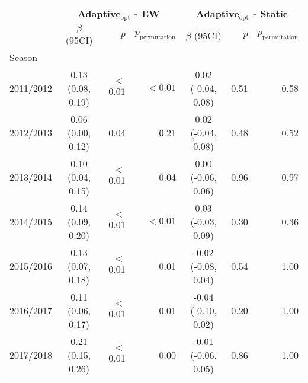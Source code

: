 \documentclass[12pt]{article}
\begin{document}
\begin{table}[ht!]
  \begin{tabular}{lcrrcrr}
    \hline
     & \multicolumn{3}{c}{\textbf{Adaptive$_{\text{opt}}$ - EW}} & \multicolumn{3}{c}{\textbf{Adaptive$_{\text{opt}}$ - Static}}\\
     & $\beta$ (95CI) & $p$ & $p_{\text{permutation}}$ & $\beta$ (95CI) & $p$ & $p_{\text{permutation}}$\\
     \hline
     
  Season\\
 \hspace{3mm} 2011/2012 & 0.13 (0.08, 0.19) & $<$0.01  &$<0.01$& 0.02 (-0.04, 0.08) &0.51&0.58\\
 \hspace{3mm} 2012/2013	& 0.06 (0.00, 0.12) &0.04&0.21& 0.02 (-0.04, 0.08) &0.48&0.52\\
 \hspace{3mm} 2013/2014	& 0.10 (0.04, 0.15) & $<$0.01  &0.04& 0.00 (-0.06, 0.06) &0.96&0.97\\
 \hspace{3mm} 2014/2015	& 0.14 (0.09, 0.20) & $<$0.01  &$<0.01$& 0.03 (-0.03, 0.09) &0.30&0.36\\
 \hspace{3mm} 2015/2016	& 0.13 (0.07, 0.18) & $<$0.01  &0.01& -0.02 (-0.08, 0.04) &0.54&1.00\\
 \hspace{3mm} 2016/2017	& 0.11 (0.06, 0.17) & $<$0.01  &0.01& -0.04 (-0.10, 0.02) &0.20&1.00\\
 \hspace{3mm} 2017/2018	& 0.21 (0.15, 0.26) & $<$0.01  &0.00& -0.01 (-0.06, 0.05) &0.86&1.00\\ 


\end{tabular}
\end{table}
\end{document}
